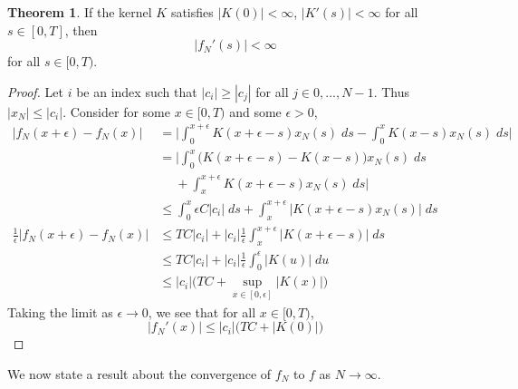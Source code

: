 \documentclass[11pt]{article}
\numberwithin{equation}{section}
\theoremstyle{definition}
\newtheorem{theorem}{Theorem}[section]
\begin{document}
\begin{theorem}
  \label{f_nderiv}
  If the kernel $K$ satisfies $|K(0)| < \infty$, $|K'(s)| < \infty$ for all $s \in [0, T]$,
  then 
$$
  |f_N'(s)|
  <
  \infty
$$
  for all $s \in [0, T)$.
\end{theorem}
\begin{proof}
Let $i$ be an index such that $|c_i| \geq |c_j|$ for all $j \in 0, ..., N-1$. Thus $|x_N| \leq |c_i|$.
Consider for some $x \in [0, T)$ and some $\epsilon > 0$,
\begin{align}
  \nonumber
  |f_N(x+\epsilon) - f_N(x)|
  &=
  \bigg|
  \int_0^{x+\epsilon} K(x+\epsilon - s)x_N(s)
  \; ds
  - \int_0^x K(x - s)x_N(s) 
  \; ds
  \bigg|
  \\
%
%
  \nonumber
  &=
  \bigg|
  \int_0^x \big(
    K(x+\epsilon - s) - K(x - s)
  \big)
  x_N(s)
  \; ds
  \\
  \nonumber
  &\quad
  \;
  + \int_x^{x+\epsilon} K(x+\epsilon-s)x_N(s)
  \; ds
  \bigg|
  \\
%
%
  \nonumber
  &\leq
  \int_0^x \epsilon C |c_i|
  \; ds
  + \int_{x}^{x+\epsilon} |K(x+\epsilon-s)x_N(s)|
  \; ds
  \\
%
%
  \nonumber
  \frac{1}{\epsilon}
  |f_N(x+\epsilon) - f_N(x)|
  &\leq
  TC|c_i| + 
  |c_i|
  \frac{1}{\epsilon}
  \int_x^{x+\epsilon} |K(x+\epsilon - s)|
  \; ds
  \\
%
%
  \nonumber
  &\leq
  TC|c_i|
  +
  |c_i|
  \frac{1}{\epsilon}
  \int_0^\epsilon |K(u)|
  \; du
  \\
%
%
  \nonumber
  &\leq
  |c_i|\Big(
    TC
    + \sup_{x\in[0, \epsilon]} |K(x)|
  \Big)
\end{align}
Taking the limit as $\epsilon \rightarrow 0$, we see that for all $x \in [0, T)$,
$$
  |f_N'(x)|
  \leq
  |c_i|\Big(
    TC
    + |K(0)|
  \Big)
$$
\end{proof}

We now state a result about the convergence of $f_N$ to $f$ as $N \rightarrow \infty$.
\end{document}
